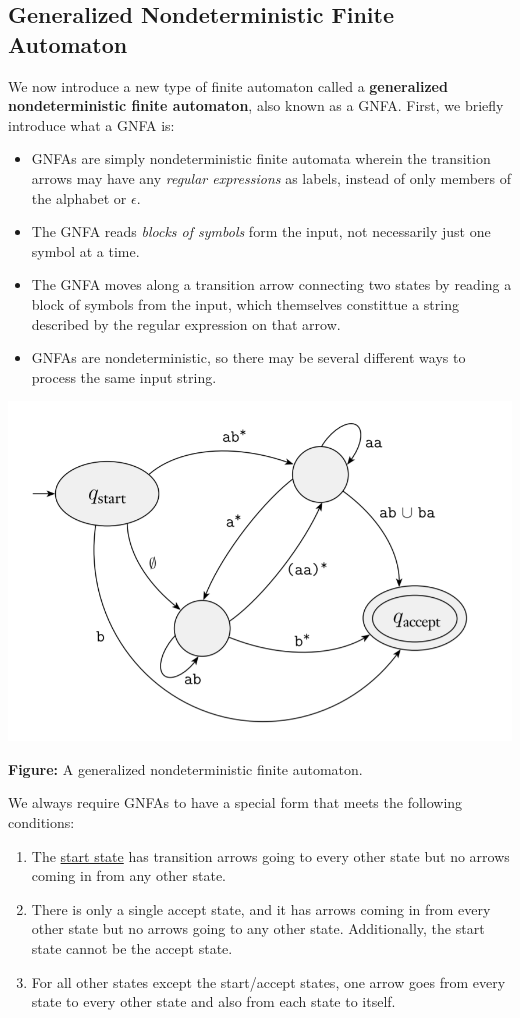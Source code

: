 \documentclass[letterpaper]{article}
\begin{document}
\subsection{Generalized Nondeterministic Finite Automaton}
We now introduce a new type of finite automaton called a \textbf{generalized nondeterministic finite automaton}, also known as a GNFA. First, we briefly introduce what a GNFA is:
\begin{itemize}
    \item GNFAs are simply nondeterministic finite automata wherein the transition arrows may have any \emph{regular expressions} as labels, instead of only members of the alphabet or $\epsilon$. 
    \item The GNFA reads \emph{blocks of symbols} form the input, not necessarily just one symbol at a time.
    \item The GNFA moves along a transition arrow connecting two states by reading a block of symbols from the input, which themselves constittue a string described by the regular expression on that arrow. 
    \item GNFAs are nondeterministic, so there may be several different ways to process the same input string.
\end{itemize}
\begin{center}
    \includegraphics[scale=0.4]{assets/gnfa_ex_1.png}

    \textbf{Figure:} A generalized nondeterministic finite automaton.
\end{center}
We always require GNFAs to have a special form that meets the following conditions: 
\begin{enumerate}
    \item The \underline{start state} has transition arrows going to every other state but no arrows coming in from any other state. 
    \item There is only a single accept state, and it has arrows coming in from every other state but no arrows going to any other state. Additionally, the start state cannot be the accept state. 
    \item For all other states except the start/accept states, one arrow goes from every state to every other state and also from each state to itself. 
\end{enumerate}
\end{document}
